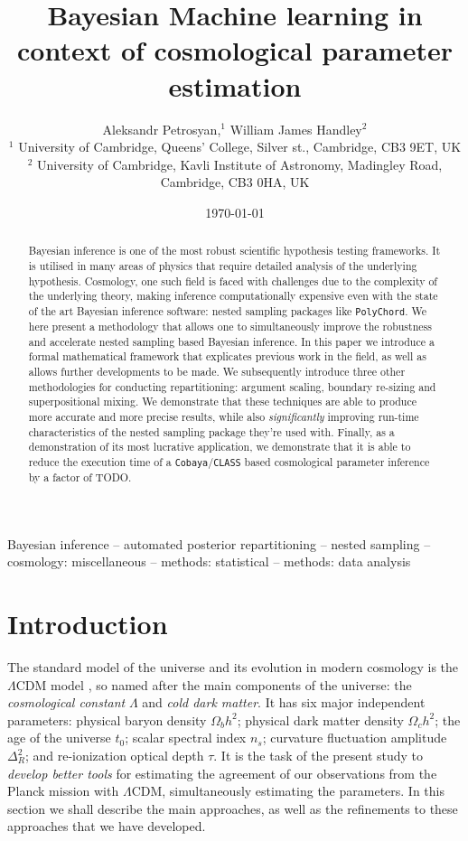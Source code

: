 \documentclass[usenatbib]{mnras}
\author[A. Petrosyan and W. J. Handley]{
  Aleksandr Petrosyan,$^{1}$
  William James Handley$^{2}$
  \\
  $^{1}$ University of Cambridge, Queens' College, Silver st., Cambridge, CB3 9ET, UK\\
  $^{2}$ University of Cambridge, Kavli Institute of Astronomy, Madingley Road, Cambridge, CB3 0HA, UK 
}
\date{\today}
\title[Stochastic posterior repartitioning]{Bayesian Machine learning in context of cosmological parameter estimation}
\begin{document}
\maketitle
\begin{abstract}
Bayesian inference is one of the most robust scientific hypothesis testing frameworks. It is utilised in many areas of physics that require detailed analysis of the underlying hypothesis. Cosmology, one such field is faced with challenges due to the complexity of the underlying theory, making inference computationally expensive even with the state of the art Bayesian inference software:  nested sampling packages like \texttt{PolyChord}. We here present a methodology that allows one to simultaneously improve the robustness and accelerate nested sampling based Bayesian inference. In this paper we introduce a formal mathematical framework that explicates previous work in the field, as well as allows further developments to be made. We subsequently introduce three other methodologies for conducting repartitioning: argument scaling, boundary re-sizing and superpositional mixing. We demonstrate that these techniques are able to produce more accurate and more precise results, while also \emph{significantly} improving run-time characteristics of the nested sampling package they're used with. Finally, as a demonstration of its most lucrative application, we demonstrate that it is able to reduce the execution time of a \texttt{Cobaya}/\texttt{CLASS} based cosmological parameter inference by a factor of TODO. 

\end{abstract}

\begin{keywords}
Bayesian inference -- automated posterior repartitioning -- nested sampling -- cosmology: miscellaneous -- methods: statistical -- methods: data analysis
\end{keywords}

\section{Introduction}\label{sec:org14413d7}

The standard model of the universe and its evolution in modern
cosmology is the \(\Lambda\)CDM model \citep{Condon2018}, so named
after the main components of the universe: the \emph{cosmological constant} \(\Lambda\)
and \emph{cold dark matter}. It has six major independent parameters:
physical baryon density \(\Omega_{b}h^{2}\); physical dark matter
density \(\Omega_{c}h^{2}\); the age of the universe \(t_{0}\); scalar
spectral index \(n_{s}\); curvature fluctuation amplitude
\(\Delta_{R}^{2}\); and re-ionization optical depth \(\tau\). It is the
task of the present study to \emph{develop better tools} for estimating
the agreement of our observations from the Planck mission with
\(\Lambda\)CDM, simultaneously estimating the parameters. In this
section we shall describe the main approaches, as well as the
refinements to these approaches that we have developed.
\end{document}
